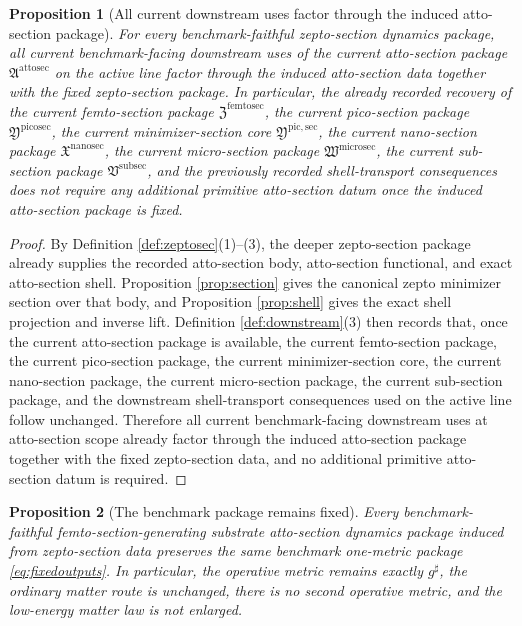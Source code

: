 \documentclass[11pt]{article}
\newcommand{\CompletedMetric}{g^{\sharp}}
\newcommand{\SubSectionPackage}{\mathfrak V^{\mathrm{subsec}}}
\newcommand{\MicroSectionPackage}{\mathfrak W^{\mathrm{microsec}}}
\newcommand{\NanoSectionPackage}{\mathfrak X^{\mathrm{nanosec}}}
\newcommand{\PicoSectionPackage}{\mathfrak Y^{\mathrm{picosec}}}
\newcommand{\PicoMinSectionCore}{\mathfrak Y^{\mathrm{pic,sec}}}
\newcommand{\FemtoSectionPackage}{\mathfrak Z^{\mathrm{femtosec}}}
\newcommand{\AttoSectionPackage}{\mathfrak A^{\mathrm{attosec}}}
\newtheorem{proposition}{Proposition}
\begin{document}
\begin{proposition}[All current downstream uses factor through the induced atto-section package]
\label{prop:downstream}
For every benchmark-faithful zepto-section dynamics package, all current benchmark-facing downstream uses of the current atto-section package \(\AttoSectionPackage\) on the active line factor through the induced atto-section data together with the fixed zepto-section package. In particular, the already recorded recovery of the current femto-section package \(\FemtoSectionPackage\), the current pico-section package \(\PicoSectionPackage\), the current minimizer-section core \(\PicoMinSectionCore\), the current nano-section package \(\NanoSectionPackage\), the current micro-section package \(\MicroSectionPackage\), the current sub-section package \(\SubSectionPackage\), and the previously recorded shell-transport consequences does not require any additional primitive atto-section datum once the induced atto-section package is fixed.
\end{proposition}

\begin{proof}
By Definition \ref{def:zeptosec}(1)--(3), the deeper zepto-section package already supplies the recorded atto-section body, atto-section functional, and exact atto-section shell. Proposition \ref{prop:section} gives the canonical zepto minimizer section over that body, and Proposition \ref{prop:shell} gives the exact shell projection and inverse lift. Definition \ref{def:downstream}(3) then records that, once the current atto-section package is available, the current femto-section package, the current pico-section package, the current minimizer-section core, the current nano-section package, the current micro-section package, the current sub-section package, and the downstream shell-transport consequences used on the active line follow unchanged. Therefore all current benchmark-facing downstream uses at atto-section scope already factor through the induced atto-section package together with the fixed zepto-section data, and no additional primitive atto-section datum is required.
\end{proof}

\begin{proposition}[The benchmark package remains fixed]
\label{prop:benchmark}
Every benchmark-faithful femto-section-generating substrate atto-section dynamics package induced from zepto-section data preserves the same benchmark one-metric package \eqref{eq:fixedoutputs}. In particular, the operative metric remains exactly \(\CompletedMetric\), the ordinary matter route is unchanged, there is no second operative metric, and the low-energy matter law is not enlarged.
\end{proposition}
\end{document}
